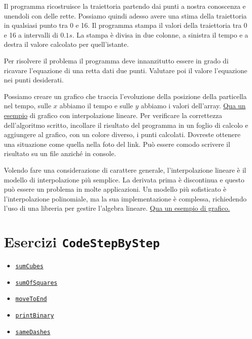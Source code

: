 \documentclass{article}
\begin{document}
Il programma ricostruisce la traiettoria partendo dai punti a nostra conoscenza e unendoli con delle rette. Possiamo quindi adesso avere una stima della traiettoria in qualsiasi punto tra 0 e 16. Il programma stampa il valori della traiettoria tra 0 e 16 a intervalli di $0.1s$. La stampa è divisa in due colonne, a sinistra il tempo e a destra il valore calcolato per quell'istante.  


\begin{info}
	Per risolvere il problema il programma deve innanzitutto essere in grado di ricavare l'equazione di una retta dati due punti. Valutare poi il valore l'equazione nei punti desiderati.
	
	Possiamo creare un grafico che traccia l'evoluzione della posizione della particella nel tempo, sulle $x$ abbiamo il tempo e sulle $y$ abbiamo i valori dell'array. \href{https://en.wikipedia.org/wiki/Linear_interpolation#/media/File:Interpolation_example_linear.svg}{Qua un esempio} di grafico con interpolazione lineare. Per verificare la correttezza dell'algoritmo scritto, incollare il risultato del programma in un foglio di calcolo e aggiungere al grafico, con un colore diverso, i punti calcolati. Dovreste ottenere una situazione come quella nella foto del link. Può essere comodo scrivere il risultato su un file anziché in console.
	
	Volendo fare una considerazione di carattere generale, l'interpolazione lineare è il modello di interpolazione più semplice. La derivata prima è discontinua e questo può essere un problema in molte applicazioni. Un modello più sofisticato è l'interpolazione polinomiale, ma la sua implementazione è complessa, richiedendo l'uso di una libreria per gestire l'algebra lineare. \href{https://en.wikipedia.org/wiki/Polynomial_interpolation#/media/File:Interpolation_example_polynomial.svg}{Qua un esempio di grafico.} 
\end{info}








\section*{Esercizi \texttt{CodeStepByStep}}
\begin{itemize}
	\item \href{https://www.codestepbystep.com/problem/view/cpp/algorithms/sumCubes}{\texttt{sumCubes}}
	\item \href{https://codestepbystep.com/problem/view/cpp/recursion/sumOfSquares}{\texttt{sumOfSquares}}
	\item \href{https://codestepbystep.com/problem/view/cpp/recursion/moveToEnd}{\texttt{moveToEnd}}
	\item \href{https://codestepbystep.com/problem/view/cpp/recursion/printBinary}{\texttt{printBinary}}
	\item \href{https://codestepbystep.com/problem/view/cpp/strings/sameDashes}{\texttt{sameDashes}}
\end{itemize}
\end{document}
